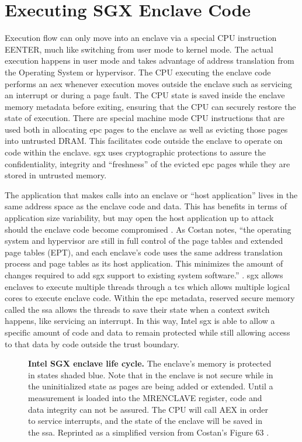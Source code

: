 \section{Executing SGX Enclave Code}
Execution flow can only move into an enclave via a special CPU instruction EENTER, much like switching from user mode to kernel mode. The actual execution happens in user mode and takes advantage of address translation from the Operating System or hypervisor. The CPU executing the enclave code performs an \gls{aex} whenever execution moves outside the enclave such as servicing an interrupt or during a page fault. The CPU state is saved inside the enclave memory metadata before exiting, ensuring that the CPU can securely restore the state of execution. There are special machine mode CPU instructions that are used both in allocating \gls{epc} pages to the enclave as well as evicting those pages into untrusted DRAM. This facilitates code outside the enclave to operate on code within the enclave. \gls{sgx} uses cryptographic protections to assure the confidentiality, integrity and ``freshness'' \cite{Costan2016} of the evicted \gls{epc} pages while they are stored in untrusted memory. 

The application that makes calls into an enclave or ``host application'' lives in the same address space as the enclave code and data. This has benefits in terms of application size variability, but may open the host application up to attack should the enclave code become compromised \cite{schwarz2019practical}. As Costan notes, ``the operating system and hypervisor are still in full control of the page tables and extended page tables (EPT), and each enclave's code uses the same address translation process and page tables as its host application. This minimizes the amount of changes required to add \gls{sgx} support to existing system software.'' \cite{Costan2016}. \gls{sgx} allows enclaves to execute multiple threads through a \gls{tcs} which allows multiple logical cores to execute enclave code. Within the \gls{epc} metadata, reserved secure memory called the \gls{ssa} allows the threads to save their state when a context switch happens, like servicing an interrupt. In this way, Intel \gls{sgx} is able to allow a specific amount of code and data to remain protected while still allowing access to that data by code outside the trust boundary.

\begin{figure}[ht]
\makebox[\textwidth][c]{}
\caption[Intel SGX Enclave Lifecycle]{\textbf{Intel SGX enclave life cycle.} The enclave's memory is protected in states shaded blue. Note that in the enclave is not secure while in the uninitialized state as pages are being added or extended. Until a measurement is loaded into the MRENCLAVE register, code and data integrity can not be assured. The CPU will call AEX in order to service interrupts, and the state of the enclave will be saved in the \gls{ssa}. Reprinted as a simplified version from Costan's Figure 63 \cite{Costan2016}.\label{figure:sgx-enclave-life-cycle}}
\end{figure}

